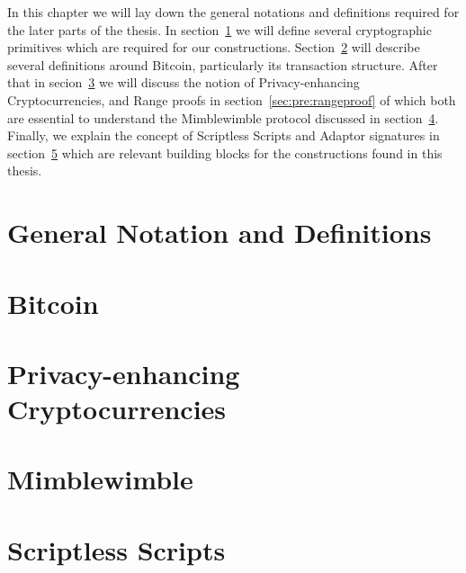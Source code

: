 In this chapter we will lay down the general notations and definitions required for the later parts of the thesis.
In section~\ref{sec:pre:general} we will define several cryptographic primitives which are required for our constructions.
Section~\ref{sec:pre:bitcoin} will describe several definitions around Bitcoin, particularly its transaction structure.
After that in secion~\ref{sec:pre:privacy} we will discuss the notion of Privacy-enhancing Cryptocurrencies, and Range proofs in section~\ref{sec:pre:rangeproof} of which both are essential to understand the Mimblewimble protocol discussed in section~\ref{sec:pre:mimblewimble}.
Finally, we explain the concept of Scriptless Scripts and Adaptor signatures in section~\ref{sec:pre:scriptless-scripts} which are relevant building blocks for the constructions found in this thesis.

\section{General Notation and Definitions}\label{sec:pre:general}


\section{Bitcoin} \label{sec:pre:bitcoin}


\section{Privacy-enhancing Cryptocurrencies} \label{sec:pre:privacy}


\section{Mimblewimble} \label{sec:pre:mimblewimble}


\section{Scriptless Scripts} \label{sec:pre:scriptless-scripts}


